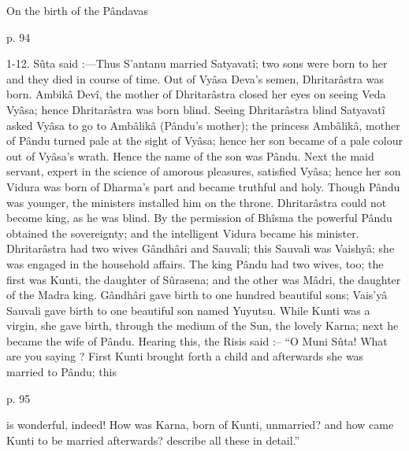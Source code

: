 ﻿On the birth of the Pândavas

 

p. 94

 

1-12. Sûta said :—Thus S’antanu married Satyavatî; two sons were born to her and they died in course of time. Out of Vyâsa Deva's semen, Dhritarâstra was born. Ambikâ Devî, the mother of Dhritarâstra closed her eyes on seeing Veda Vyâsa; hence Dhritarâstra was born blind. Seeing Dhritarâstra blind Satyavatî asked Vyâsa to go to Ambâlikâ (Pându's mother); the princess Ambâlikâ, mother of Pându turned pale at the sight of Vyâsa; hence her son became of a pale colour out of Vyâsa's wrath. Hence the name of the son was Pându. Next the maid servant, expert in the science of amorous pleasures, satisfied Vyâsa; hence her son Vidura was born of Dharma's part and became truthful and holy. Though Pându was younger, the ministers installed him on the throne. Dhritarâstra could not become king, as he was blind. By the permission of Bhîsma the powerful Pându obtained the sovereignty; and the intelligent Vidura became his minister. Dhritarâstra had two wives Gândhâri and Sauvali; this Sauvali was Vaishyâ; she was engaged in the household affairs. The king Pându had two wives, too; the first was Kunti, the daughter of Sûrasena; and the other was Mâdri, the daughter of the Madra king. Gândhâri gave birth to one hundred beautiful sons; Vais'yâ Sauvali gave birth to one beautiful son named Yuyutsu. While Kunti was a virgin, she gave birth, through the medium of the Sun, the lovely Karna; next he became the wife of Pându. Hearing this, the Risis said :-- “O Muni Sûta! What are you saying ? First Kunti brought forth a child and afterwards she was married to Pându; this

 

p. 95

 

is wonderful, indeed! How was Karna, born of Kunti, unmarried? and how came Kunti to be married afterwards? describe all these in detail.”

 

